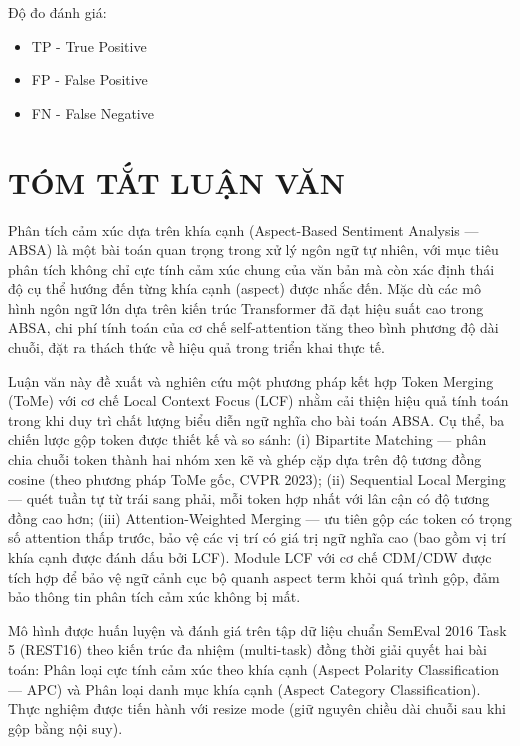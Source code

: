 ﻿\documentclass[14pt]{extreport}
\begin{document}
Độ đo đánh giá:
\begin{itemize}
    \item TP - True Positive
    \item FP - False Positive
    \item FN - False Negative
\end{itemize}

\newpage
\listoftables
{}

\newpage
\listoffigures
{}

\chapter*{TÓM TẮT LUẬN VĂN}
Phân tích cảm xúc dựa trên khía cạnh (Aspect-Based Sentiment Analysis — ABSA) là một bài toán quan trọng trong xử lý ngôn ngữ tự nhiên, với mục tiêu phân tích không chỉ cực tính cảm xúc chung của văn bản mà còn xác định thái độ cụ thể hướng đến từng khía cạnh (aspect) được nhắc đến. Mặc dù các mô hình ngôn ngữ lớn dựa trên kiến trúc Transformer đã đạt hiệu suất cao trong ABSA, chi phí tính toán của cơ chế self-attention tăng theo bình phương độ dài chuỗi, đặt ra thách thức về hiệu quả trong triển khai thực tế.

Luận văn này đề xuất và nghiên cứu một phương pháp kết hợp Token Merging (ToMe) với cơ chế Local Context Focus (LCF) nhằm cải thiện hiệu quả tính toán trong khi duy trì chất lượng biểu diễn ngữ nghĩa cho bài toán ABSA. Cụ thể, ba chiến lược gộp token được thiết kế và so sánh: (i) Bipartite Matching — phân chia chuỗi token thành hai nhóm xen kẽ và ghép cặp dựa trên độ tương đồng cosine (theo phương pháp ToMe gốc, CVPR 2023); (ii) Sequential Local Merging — quét tuần tự từ trái sang phải, mỗi token hợp nhất với lân cận có độ tương đồng cao hơn; (iii) Attention-Weighted Merging — ưu tiên gộp các token có trọng số attention thấp trước, bảo vệ các vị trí có giá trị ngữ nghĩa cao (bao gồm vị trí khía cạnh được đánh dấu bởi LCF). Module LCF với cơ chế CDM/CDW được tích hợp để bảo vệ ngữ cảnh cục bộ quanh aspect term khỏi quá trình gộp, đảm bảo thông tin phân tích cảm xúc không bị mất.

Mô hình được huấn luyện và đánh giá trên tập dữ liệu chuẩn SemEval 2016 Task 5 (REST16) theo kiến trúc đa nhiệm (multi-task) đồng thời giải quyết hai bài toán: Phân loại cực tính cảm xúc theo khía cạnh (Aspect Polarity Classification — APC) và Phân loại danh mục khía cạnh (Aspect Category Classification). Thực nghiệm được tiến hành với resize mode (giữ nguyên chiều dài chuỗi sau khi gộp bằng nội suy).
\end{document}
